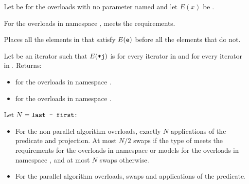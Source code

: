 \begin{itemdescr}
\pnum
Let  be 
for the overloads with no parameter named 
and let $E(x)$ be .

\pnum
\expects
For the overloads in namespace ,
 meets
the  requirements.

\pnum
\effects
Places all the elements  in 
that satisfy $E(\tcode{e})$ before all the elements that do not.

\pnum
\returns
Let  be an iterator such that $E(\tcode{*j})$ is
 for every iterator  in  and
 for every iterator  in .
Returns:
\begin{itemize}
\item {} for the overloads in namespace .
\item {} for the overloads in namespace .
\end{itemize}


\pnum
\complexity
Let $N = \tcode{last - first}$:
\begin{itemize}
\item
  For the non-parallel algorithm overloads,
  exactly $N$ applications of the predicate and projection.
  At most $N / 2$ swaps if the type of  meets
  the  requirements
  for the overloads in namespace  or
  models 
  for the overloads in namespace ,
  and at most $N$ swaps otherwise.
\item
  For the parallel algorithm overloads,
   swaps and  applications of the predicate.
\end{itemize}

\end{itemdescr}

